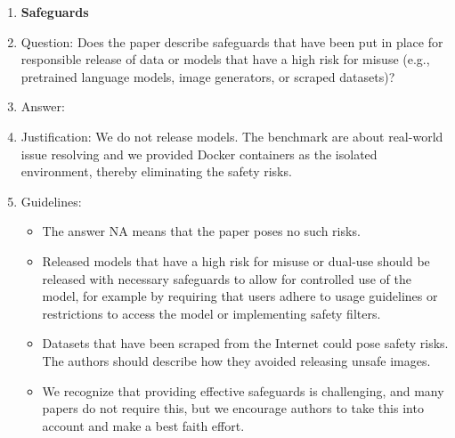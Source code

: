 \begin{enumerate}
\item {\bf Safeguards}
    \item[] Question: Does the paper describe safeguards that have been put in place for responsible release of data or models that have a high risk for misuse (e.g., pretrained language models, image generators, or scraped datasets)?
    \item[] Answer: \answerNA{} %
    \item[] Justification: We do not release models. The benchmark are about real-world issue resolving and we provided Docker containers as the isolated environment, thereby eliminating the safety risks.
    \item[] Guidelines:
    \begin{itemize}
        \item The answer NA means that the paper poses no such risks.
        \item Released models that have a high risk for misuse or dual-use should be released with necessary safeguards to allow for controlled use of the model, for example by requiring that users adhere to usage guidelines or restrictions to access the model or implementing safety filters. 
        \item Datasets that have been scraped from the Internet could pose safety risks. The authors should describe how they avoided releasing unsafe images.
        \item We recognize that providing effective safeguards is challenging, and many papers do not require this, but we encourage authors to take this into account and make a best faith effort.
    \end{itemize}


\end{enumerate}
